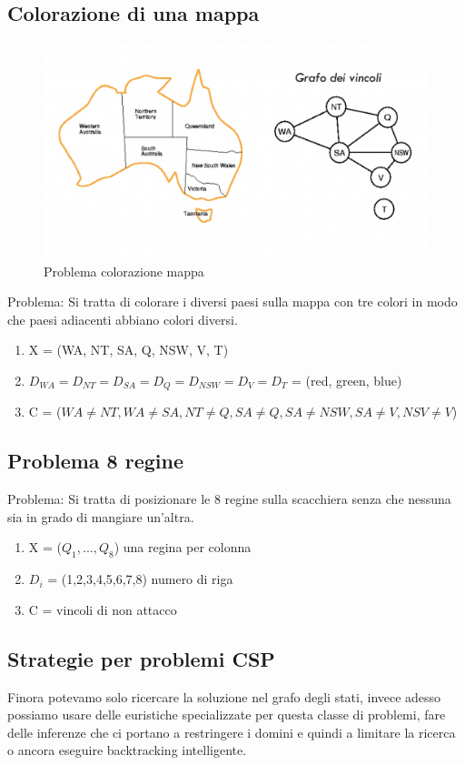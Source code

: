 \documentclass{article}
\begin{document}
\subsection{Colorazione di una mappa}
\begin{figure}[h!]
\centering
\includegraphics[scale=0.4]{Images/mappacolorata.png}
\caption{Problema colorazione mappa}
\end{figure}
Problema: Si tratta di colorare i diversi paesi sulla mappa con tre colori in modo che paesi adiacenti abbiano colori diversi.
\begin{enumerate}
    \item X = (WA, NT, SA, Q, NSW, V, T)
    \item $D_{WA} = D_{NT} = D_{SA} = D_Q = D_{NSW} = D_{V} = D_T$ = (red, green, blue)
    \item C = ($WA \neq NT, WA \neq SA, NT \neq Q, SA \neq Q, SA \neq NSW, SA \neq V, NSV \neq V$)
\end{enumerate}
\subsection{Problema 8 regine}
Problema: Si tratta di posizionare le 8 regine sulla scacchiera senza che nessuna sia in grado di mangiare un'altra.
\begin{enumerate}
    \item X = ($Q_1, ..., Q_8$) una regina per colonna
    \item $D_i$ = (1,2,3,4,5,6,7,8) numero di riga
    \item C = vincoli di non attacco
\end{enumerate}
\subsection{Strategie per problemi CSP}
Finora potevamo solo ricercare la soluzione nel grafo degli stati, invece adesso possiamo usare delle euristiche specializzate per questa classe di problemi, fare delle inferenze che ci portano a restringere i domini e quindi a limitare la ricerca o ancora eseguire backtracking intelligente.
\end{document}
